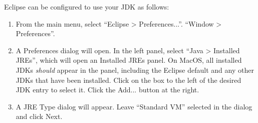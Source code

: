 Eclipse can be configured to use your JDK as follows:

\begin{enumerate}

\item From the main menu, select 
\ifMacOS
``{\sf Eclipse > Preferences...}''.
\else
``{\sf Window > Preferences}''.
\fi

\item A {\sf Preferences} dialog will open. In the left panel, select
``{\sf Java > Installed JREs}'', which will open an {\sf Installed JREs}
panel.
\ifMacOS %
On MacOS, all installed JDKs {\it should} appear in the panel,
including the Eclipse default and any other JDKs that have been installed.
Click on the box to the left of the desired JDK entry to select it.
\else %
Click the {\sf Add...} button at the right.

\item A {\sf JRE Type} dialog will appear. Leave ``Standard VM''
selected in the dialog and click {\sf Next}.


\end{enumerate}
